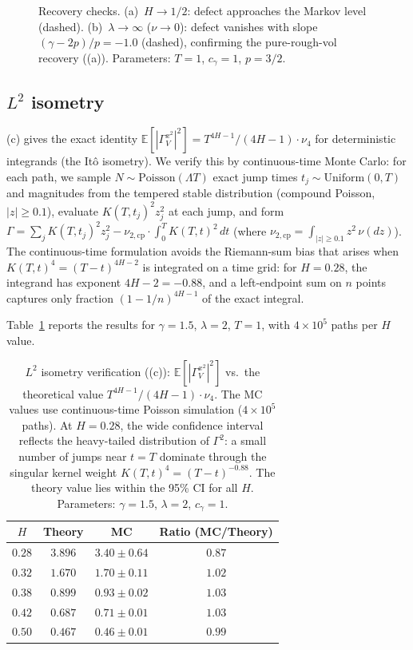 \documentclass[11pt,a4paper]{article}
\theoremstyle{plain}
\theoremstyle{definition}
\theoremstyle{remark}
\newcommand{\E}{\mathbb{E}}
\begin{document}
\begin{figure}[ht]
\centering
\caption{Recovery checks.
(a)~$H \to 1/2$: defect approaches the Markov level
(dashed).
(b)~$\lambda \to \infty$ ($\nu \to 0$): defect vanishes
with slope $(\gamma - 2p)/p = -1.0$ (dashed), confirming
the pure-rough-vol recovery ((a)).
Parameters: $T = 1$, $c_\gamma = 1$, $p = 3/2$.}
\label{fig:recovery}
\end{figure}


\subsection{$L^2$ isometry}

(c) gives the exact identity
$\E[|\Gamma_V^{x^2}|^2]
= T^{4H-1}/(4H-1) \cdot \nu_4$
for deterministic integrands (the It\^o isometry).
We verify this by continuous-time Monte Carlo:
for each path, we sample $N \sim \mathrm{Poisson}(\Lambda T)$
exact jump times $t_j \sim \mathrm{Uniform}(0,T)$ and
magnitudes from the tempered stable distribution
(compound Poisson, $|z| \geq 0.1$), evaluate
$K(T,t_j)^2 z_j^2$ at each jump, and form
$\Gamma = \sum_j K(T,t_j)^2 z_j^2 - \nu_{2,\mathrm{cp}} \cdot
\int_0^T K(T,t)^2\,dt$
(where $\nu_{2,\mathrm{cp}} = \int_{|z| \geq 0.1}
z^2\,\nu(dz)$).
The continuous-time formulation avoids the Riemann-sum
bias that arises when $K(T,t)^4 = (T-t)^{4H-2}$ is
integrated on a time grid: for $H = 0.28$, the integrand
has exponent $4H - 2 = -0.88$, and a left-endpoint sum
on $n$ points captures only fraction
$(1 - 1/n)^{4H-1}$ of the exact integral.

Table~\ref{tab:isometry} reports the results for
$\gamma = 1.5$, $\lambda = 2$, $T = 1$, with
$4 \times 10^5$ paths per $H$ value.

\begin{table}[ht]
\centering
\begin{tabular}{c|ccc}
$H$ & Theory & MC & Ratio (MC/Theory) \\
\hline
$0.28$ & $3.896$ & $3.40 \pm 0.64$ & $0.87$ \\
$0.32$ & $1.670$ & $1.70 \pm 0.11$ & $1.02$ \\
$0.38$ & $0.899$ & $0.93 \pm 0.02$ & $1.03$ \\
$0.42$ & $0.687$ & $0.71 \pm 0.01$ & $1.03$ \\
$0.50$ & $0.467$ & $0.46 \pm 0.01$ & $0.99$ \\
\end{tabular}
\caption{$L^2$ isometry verification
((c)):
$\E[|\Gamma_V^{x^2}|^2]$ vs.\ the theoretical value
$T^{4H-1}/(4H-1) \cdot \nu_4$.
The MC values use continuous-time Poisson simulation
($4 \times 10^5$ paths).
At $H = 0.28$, the wide confidence interval reflects the
heavy-tailed distribution of $\Gamma^2$: a small number
of jumps near $t = T$ dominate through the singular
kernel weight $K(T,t)^4 = (T-t)^{-0.88}$.
The theory value lies within the 95\% CI for all $H$.
Parameters: $\gamma = 1.5$, $\lambda = 2$, $c_\gamma = 1$.}
\label{tab:isometry}
\end{table}
\end{document}
